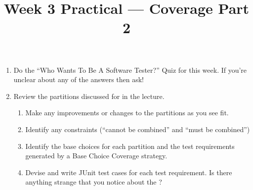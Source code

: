



\title{Week 3 Practical --- Coverage Part 2}

\begin{enumerate}

    \item Do the ``Who Wants To Be A Software Tester?'' Quiz for this week.
    If you're unclear about any of the answers then ask!

    \item Review the partitions discussed for \triangleclass in the lecture.
    
    \begin{enumerate}
        \item Make any improvements or changes to the partitions as you see fit.
        
        \item Identify any constraints (``cannot be combined'' and ``must be combined'')
        
        \item Identify the base choices for each partition and the test
        requirements generated by a Base Choice Coverage strategy.

        \item Devise and write JUnit test cases for each test requirement. Is
        there anything strange that you notice about the \triangleclass?
    \end{enumerate}
        

\end{enumerate}

